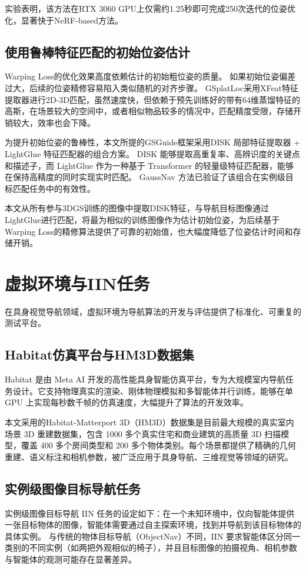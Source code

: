 实验表明，该方法在RTX 3060 GPU上仅需约1.25秒即可完成250次迭代的位姿优化，显著快于NeRF-based方法。

\subsection{使用鲁棒特征匹配的初始位姿估计}
Warping Loss的优化效果高度依赖估计的初始粗位姿的质量。
如果初始位姿偏差过大，后续的位姿精修容易陷入类似随机的对齐步骤。
GSplatLoc\cite{gsplatloc}采用XFeat\cite{xfeat}特征提取器进行2D-3D匹配，虽然速度快，但依赖于预先训练好的带有64维蒸馏特征的高斯，在场景较大的空间中，或者相似物品较多的情况中，匹配精度受限，存储开销较大，效率也会下降。

为提升初始位姿的鲁棒性，本文所提的GSGuide框架采用DISK 局部特征提取器\cite{disk} + LightGlue 特征匹配器\cite{lightglue}的组合方案。
DISK\cite{disk} 能够提取高重复率、高辨识度的关键点和描述子，而 LightGlue\cite{lightglue} 作为一种基于 Transformer 的轻量级特征匹配器，能够在保持高精度的同时实现实时匹配。
GaussNav\cite{gaussnav} 方法已验证了该组合在实例级目标匹配任务中的有效性。

本文从所有参与3DGS训练的图像中提取DISK\cite{disk}特征，与导航目标图像通过LightGlue\cite{lightglue}进行匹配，将最为相似的训练图像作为估计初始位姿，为后续基于Warping Loss的精修算法提供了可靠的初始值，也大幅度降低了位姿估计时间和存储开销。

\section{虚拟环境与IIN任务}
在具身视觉导航领域，虚拟环境为导航算法的开发与评估提供了标准化、可重复的测试平台。

\subsection{Habitat仿真平台与HM3D数据集}
Habitat\cite{habitat-sim} 是由 Meta AI 开发的高性能具身智能仿真平台，专为大规模室内导航任务设计。它支持物理真实的渲染、刚体物理模拟和多智能体并行训练，能够在单 GPU 上实现每秒数千帧的仿真速度，大幅提升了算法的开发效率。

本文采用的Habitat-Matterport 3D（HM3D）\cite{HM3D}数据集是目前最大规模的真实室内场景 3D 重建数据集，包含 1000 多个真实住宅和商业建筑的高质量 3D 扫描模型，覆盖 400 多个房间类型和 200 多个物体类别。每个场景都提供了精确的几何重建、语义标注和相机参数，被广泛应用于具身导航、三维视觉等领域的研究。

\subsection{实例级图像目标导航任务}
实例级图像目标导航 IIN\cite{krantz2022instance} 任务的设定如下：在一个未知环境中，仅向智能体提供一张目标物体的图像，智能体需要通过自主探索环境，找到并导航到该目标物体的具体实例。
与传统的物体目标导航（ObjectNav）不同，IIN\cite{krantz2022instance} 要求智能体区分同一类别的不同实例（如两把外观相似的椅子），并且目标图像的拍摄视角、相机参数与智能体的观测可能存在显著差异。

